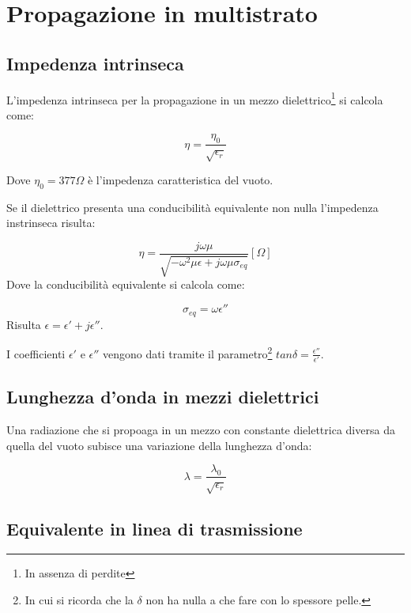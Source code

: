 \documentclass[10pt,a4paper]{report}
\begin{document}
\chapter{Propagazione in multistrato}

	\section{Impedenza intrinseca}

		L'impedenza intrinseca per la propagazione in un mezzo dielettrico\footnote{In assenza di perdite} si calcola come:

		\begin{equation}
		\eta=\frac{\eta_0}{\sqrt{\epsilon_r}}
		\end{equation}

		Dove $\eta_0=377\Omega$ è l'impedenza caratteristica del vuoto.

		Se il dielettrico presenta una conducibilità equivalente non nulla l'impedenza instrinseca risulta:

		\begin{equation}
		\eta=\frac{j\omega\mu}{\sqrt{-\omega^2\mu\epsilon+j\omega\mu\sigma_{eq}}} [  \Omega  ]
		\end{equation}
		Dove la conducibilità equivalente si calcola come:

		\begin{equation}
		\sigma_{eq}=\omega \epsilon''
		\end{equation}
		Risulta $\epsilon=\epsilon'+j\epsilon''$.
		
		I coefficienti $\epsilon'$ e $\epsilon''$ vengono dati tramite il parametro\footnote{In cui si ricorda che la $\delta$ non ha nulla a che fare con lo spessore pelle.} $tan\delta=\frac{\epsilon''}{\epsilon'}$.

	\section{Lunghezza d'onda in mezzi dielettrici}
		Una radiazione che si propoaga in un mezzo con constante dielettrica diversa da quella del vuoto subisce una variazione della lunghezza d'onda:

		\begin{equation} 
		\lambda = \frac {\lambda_0} {\sqrt {\epsilon_r} }
		\end{equation} 

	\section{Equivalente in linea di trasmissione}
\end{document}
